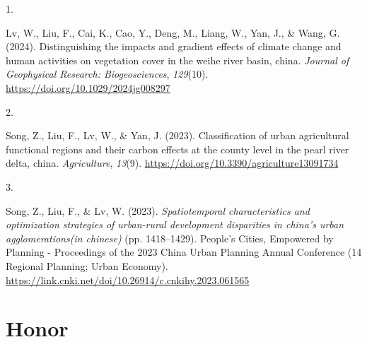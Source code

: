 \documentclass[11pt,a4paper,]{moderncv}
\newlength{\cslhangindent}
\newlength{\csllabelwidth}
\newenvironment{CSLReferences}[2] %
 {\begin{list}{}{%
  \setlength{\itemindent}{0pt}
  \setlength{\leftmargin}{0pt}
  \setlength{\parsep}{0pt}
  \ifodd #1
   \setlength{\leftmargin}{\cslhangindent}
   \setlength{\itemindent}{-1\cslhangindent}
  \fi
  \setlength{\itemsep}{#2\baselineskip}}}
 {\end{list}}
\newcommand{\CSLLeftMargin}[1]{\parbox[t]{\csllabelwidth}{\strut#1\strut}}
\newcommand{\CSLRightInline}[1]{\parbox[t]{\linewidth - \csllabelwidth}{\strut#1\strut}}
\begin{document}
\label{refs-bc3c267572cf41206263d20af8c9f9e1}
\begin{CSLReferences}{0}{0}
\CSLLeftMargin{1. }%
\CSLRightInline{Lv, W., Liu, F., Cai, K., Cao, Y., Deng, M., Liang, W.,
Yan, J., \& Wang, G. (2024). Distinguishing the impacts and gradient
effects of climate change and human activities on vegetation cover in
the weihe river basin, china. \emph{Journal of Geophysical Research:
Biogeosciences}, \emph{129}(10).
\url{https://doi.org/10.1029/2024jg008297}}

\CSLLeftMargin{2. }%
\CSLRightInline{Song, Z., Liu, F., Lv, W., \& Yan, J. (2023).
Classification of urban agricultural functional regions and their carbon
effects at the county level in the pearl river delta, china.
\emph{Agriculture}, \emph{13}(9).
\url{https://doi.org/10.3390/agriculture13091734}}

\CSLLeftMargin{3. }%
\CSLRightInline{Song, Z., Liu, F., \& Lv, W. (2023).
\emph{Spatiotemporal characteristics and optimization strategies of
urban-rural development disparities in china's urban agglomerations(in
chinese)} (pp. 1418--1429). People's Cities, Empowered by Planning -
Proceedings of the 2023 China Urban Planning Annual Conference (14
Regional Planning; Urban Economy).
\url{https://link.cnki.net/doi/10.26914/c.cnkihy.2023.061565}}

\end{CSLReferences}

\section{Honor}\label{honor}

\nopagebreak
\end{document}
